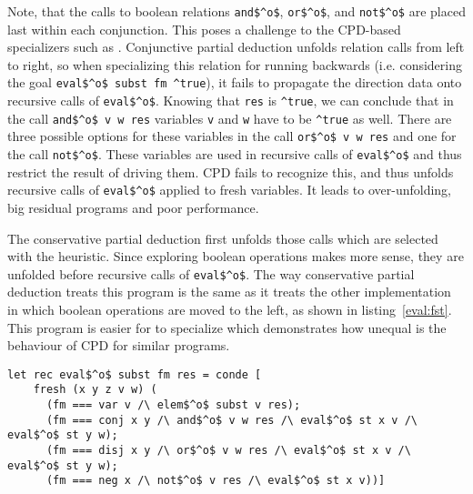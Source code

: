 Note, that the calls to boolean relations \lstinline{and$^o$}, \lstinline{or$^o$}, and \lstinline{not$^o$} are placed last within each conjunction.
This poses a challenge to the CPD-based specializers such as \ecce.
Conjunctive partial deduction unfolds relation calls from left to right, so when specializing this relation for running backwards (i.e. considering the goal \lstinline{eval$^o$ subst fm ^true}), it fails to propagate the direction data onto recursive calls of \lstinline{eval$^o$}.
Knowing that \lstinline{res} is \lstinline{^true}, we can conclude that in the call \lstinline{and$^o$ v w res} variables \lstinline{v} and \lstinline{w} have to be \lstinline{^true} as well.
There are three possible options for these variables in the call \lstinline{or$^o$ v w res} and one for the call \lstinline{not$^o$}.
These variables are used in recursive calls of \lstinline{eval$^o$} and thus restrict the result of driving them.
CPD fails to recognize this, and thus unfolds recursive calls of \lstinline{eval$^o$} applied to fresh variables.
It leads to over-unfolding, big residual programs and poor performance.

The conservative partial deduction first unfolds those calls which are selected with the heuristic.
Since exploring boolean operations makes more sense, they are unfolded before recursive calls of \lstinline{eval$^o$}.
The way conservative partial deduction treats this program is the same as it treats the other implementation in which boolean operations are moved to the left, as shown in listing~\ref{eval:fst}.
This program is easier for \ecce to specialize which demonstrates how unequal is the behaviour of CPD for similar programs.

\begin{figure*}[!h]
  \centering
  \begin{minipage}{0.95\textwidth}
    \begin{lstlisting}[label={eval:fst}, caption={Evaluator of formulas with boolean operation second}, captionpos=b, frame=tb]
  let rec eval$^o$ subst fm res = conde [
    fresh (x y z v w) (
      (fm === var v /\ elem$^o$ subst v res);
      (fm === conj x y /\ and$^o$ v w res /\ eval$^o$ st x v /\ eval$^o$ st y w);
      (fm === disj x y /\ or$^o$ v w res /\ eval$^o$ st x v /\ eval$^o$ st y w);
      (fm === neg x /\ not$^o$ v res /\ eval$^o$ st x v))]
    \end{lstlisting}
  \end{minipage}
\end{figure*}

